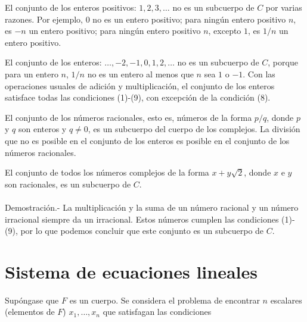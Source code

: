 \begin{ejem}
    El conjunto de los enteros positivos: $1,2,3,\ldots$ no es un subcuerpo de $C$ por varias razones. Por ejemplo, $0$ no es un entero positivo; para ningún entero positivo $n$, es $-n$ un entero positivo; para ningún entero positivo $n$, excepto $1$, es $1/n$ un entero positivo.\\
\end{ejem}

\begin{ejem}
    El conjunto de los enteros: $\ldots,-2,-1,0,1,2,\ldots$ no es un subcuerpo de $C$, porque para un entero $n$, $1/n$ no es un entero al menos que $n$ sea $1$ o $-1$. Con las operaciones usuales de adición y multiplicación, el conjunto de los enteros satisface todas las condiciones (1)-(9), con excepción de la condición (8).\\
\end{ejem}

\begin{ejem}
    El conjunto de los números racionales, esto es, números de la forma $p/q$, donde $p$ y $q$ son enteros y $q\neq 0$, es un subcuerpo del cuerpo de los complejos. La división que no es posible en el conjunto de los enteros es posible en el conjunto de los números racionales.\\
\end{ejem}

\begin{ejem}
    El conjunto de todos los números complejos de la forma $x+y\sqrt{2}$, donde $x$ e $y$ son racionales, es un subcuerpo de $C$.\\\\
	Demostración.-\; La multiplicación y la suma de un número racional y un número irracional siempre da un irracional. Estos números cumplen las condiciones (1)-(9), por lo que podemos concluir que este conjunto es un subcuerpo de $C$.\\
\end{ejem}

\section{Sistema de ecuaciones lineales}
Supóngase que $F$ es un cuerpo. Se considera el problema de encontrar $n$ escalares (elementos de $F$) $x_1,\ldots,x_n$ que satisfagan las condiciones 

